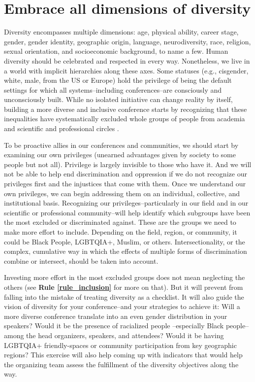 \documentclass[10pt,letterpaper]{article}
\begin{document}
\section{Embrace all dimensions of diversity}
\label{rule_diversity}

Diversity encompasses multiple dimensions: age, physical ability, career stage, gender, gender identity, geographic origin, language, neurodiversity, race, religion, sexual orientation, and socioeconomic background, to name a few. 
Human diversity should be celebrated and respected in every way. Nonetheless, we live in a world with implicit hierarchies along these axes. Some statuses (e.g., cisgender, white, male, from the US or Europe) hold the privilege of being the default settings for which all systems--including conferences--are consciously and unconsciously built.  
While no isolated initiative can change reality by itself, building a more diverse and inclusive conference starts by recognizing that these inequalities have systematically excluded whole groups of people from academia and scientific and professional circles \cite{timperleyHeMoanaPukepuke2020}. 

To be proactive allies in our conferences and communities, we should start by examining our own privileges (unearned advantages given by society to some people but not all).
Privilege is largely invisible to those who have it. And we will not be able to help end discrimination and oppression if we do not recognize our privileges first and the injustices that come with them.
Once we understand our own privileges, we can begin addressing them on an individual, collective, and institutional basis.
Recognizing our privileges--particularly in our field and in our scientific or professional community--will help identify which subgroups have been the most excluded or discriminated against. 
These are the groups we need to make more effort to include. 
Depending on the field, region, or community, it could be Black People, LGBTQIA+, Muslim, or others. 
Intersectionality, or the complex, cumulative way in which the effects of multiple forms of discrimination combine or intersect, should be taken into account. 

Investing more effort in the most excluded groups does not mean neglecting the others (see \textbf{Rule \ref{rule_inclusion}} for more on that). 
But it will prevent from falling into the mistake of treating diversity as a checklist.
It will also guide the vision of diversity for your conference--and your strategies to achieve it:
Will a more diverse conference translate into an even gender distribution in your speakers? 
Would it be the presence of racialized people --especially Black people-- among the head organizers, speakers, and attendees? 
Would it be having LGBTQIA+ friendly-spaces or community participation from key geographic regions?
This exercise will also help coming up with indicators that would help the organizing team assess the fulfillment of the diversity objectives along the way. 
\end{document}
